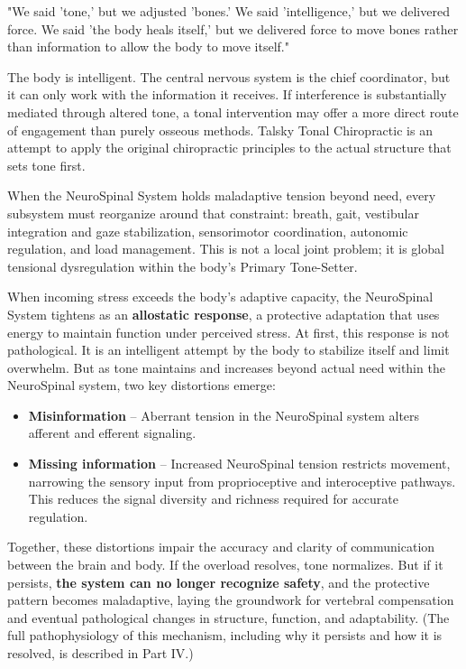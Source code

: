 \documentclass[11pt,letterpaper]{article}
\begin{document}
\begin{pullquotebox}
"We said 'tone,' but we adjusted 'bones.' We said 'intelligence,' but we delivered force. We said 'the body heals itself,' but we delivered force to move bones rather than information to allow the body to move itself."
\end{pullquotebox}

The body is intelligent. The central nervous system is the chief coordinator, but it can only work with the information it receives. If interference is substantially mediated through altered tone, a tonal intervention may offer a more direct route of engagement than purely osseous methods. Talsky Tonal Chiropractic is an attempt to apply the original chiropractic principles to the actual structure that sets tone first.


When the NeuroSpinal System holds maladaptive tension beyond need, every subsystem must reorganize around that constraint: breath, gait, vestibular integration and gaze stabilization, sensorimotor coordination, autonomic regulation, and load management. This is not a local joint problem; it is global tensional dysregulation within the body's Primary Tone-Setter.


When incoming stress exceeds the body's adaptive capacity, the NeuroSpinal System tightens as an \textbf{allostatic response}, a protective adaptation that uses energy to maintain function under perceived stress. At first, this response is not pathological. It is an intelligent attempt by the body to stabilize itself and limit overwhelm. But as tone maintains and increases beyond actual need within the NeuroSpinal system, two key distortions emerge:


\begin{itemize}
\item \textbf{Misinformation} – Aberrant tension in the NeuroSpinal system alters afferent and efferent signaling.
\item \textbf{Missing information} – Increased NeuroSpinal tension restricts movement, narrowing the sensory input from proprioceptive and interoceptive pathways. This reduces the signal diversity and richness required for accurate regulation.
\end{itemize}

Together, these distortions impair the accuracy and clarity of communication between the brain and body. If the overload resolves, tone normalizes. But if it persists, \textbf{the system can no longer recognize safety}, and the protective pattern becomes maladaptive, laying the groundwork for vertebral compensation and eventual pathological changes in structure, function, and adaptability. (The full pathophysiology of this mechanism, including why it persists and how it is resolved, is described in Part IV.)
\end{document}
